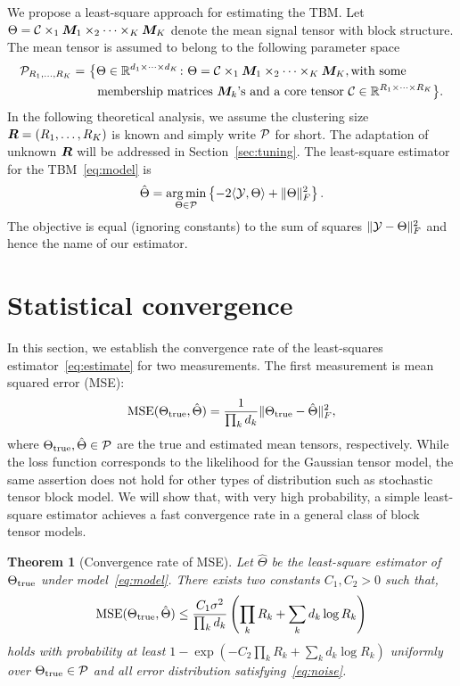 \documentclass{article}
\newtheorem{theorem}{Theorem}
\begin{document}
We propose a least-square approach for estimating the TBM. Let $\Theta=\mathcal{C}\times_1\bm M_1\times_2\cdots\times_K\bm M_K$ denote the mean signal tensor with block structure. The mean tensor is assumed to belong to the following parameter space
\begin{align}\label{eq:space}
\mathcal{P}_{R_1,\ldots,R_K}=&\ \big\{ \Theta\in\mathbb{R}^{d_1\times \cdots \times d_K}\colon \Theta=\mathcal{C}\times_1\bm M_1\times_2\cdots\times_K\bm M_K, \text{with some}\notag \\
 &\quad \text{membership matrices $\bm M_k$'s and a core tensor $\mathcal{C}\in\mathbb{R}^{R_1\times \cdots \times R_K}$}\big\}\notag .
\end{align}
In the following theoretical analysis, we assume the clustering size $\bm{R}=(R_1,\ldots,R_K)$ is known and simply write $\mathcal{P}$ for short. The adaptation of unknown $\bm{R}$ will be addressed in Section~\ref{sec:tuning}. The least-square estimator for the TBM~\eqref{eq:model} is
\begin{equation}\label{eq:estimate}
\hat \Theta=\operatorname*{arg\,min}_{\Theta\in\mathcal{P}}\left\{ -2\langle \mathcal{Y},\Theta\rangle + \lVert\Theta\rVert_F^2\right\}.
\end{equation}
The objective is equal (ignoring constants) to the sum of squares $\lVert\mathcal{Y}-\Theta\rVert_F^2$ and hence the name of our estimator. 

\section{Statistical convergence}\label{sec:theory}

In this section, we establish the convergence rate of the least-squares estimator~\eqref{eq:estimate} for two measurements. The first measurement is mean squared error (MSE):
\begin{equation} \label{eq:MSE}
\text{MSE}(\Theta_{\text{true}},\hat \Theta)={1\over \prod_k d_k}\lVert\Theta_{\text{true}}-\hat \Theta\rVert_F^2,
\end{equation}
where $\Theta_{\text{true}}, \hat \Theta\in\mathcal{P}$ are the true and estimated mean tensors, respectively. While the loss function corresponds to the likelihood for the Gaussian tensor model, the same assertion does not hold for other types of distribution such as stochastic tensor block model. We will show that, with very high probability, a simple least-square estimator achieves a fast convergence rate in a general class of block tensor models.  



\begin{theorem}[Convergence rate of MSE] \label{thm:mse}
Let $\hat \Theta$ be the least-square estimator of $\Theta_{\text{true}}$ under model~\eqref{eq:model}. There exists two constants $C_1, C_2>0$ such that,  
\begin{equation} \label{eq:bound}
\text{MSE}(\Theta_{\text{true}},\hat \Theta)\leq {C_1 \sigma^2\over  \prod_k d_k} \left(\prod_k R_k+\sum_k d_k \log R_k\right)
\end{equation}
holds with probability at least $1-\exp(-C_2\prod_k R_k+\sum_k d_k\log R_k)$ uniformly over $\Theta_{\text{true}}\in\mathcal{P}$ and all error distribution satisfying~\eqref{eq:noise}. 
\end{theorem}
\end{document}
